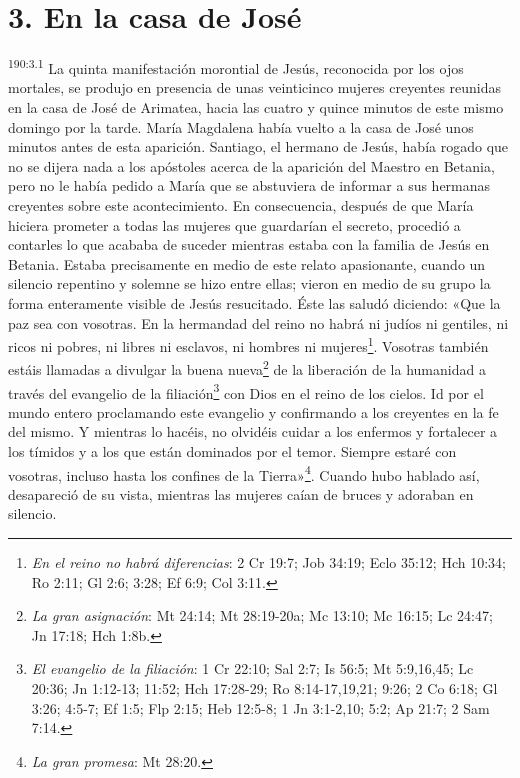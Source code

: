 \section*{3. En la casa de José}
\par
\textsuperscript{190:3.1} La quinta manifestación morontial de Jesús, reconocida por los ojos mortales, se produjo en presencia de unas veinticinco mujeres creyentes reunidas en la casa de José de Arimatea, hacia las cuatro y quince minutos de este mismo domingo por la tarde. María Magdalena había vuelto a la casa de José unos minutos antes de esta aparición. Santiago, el hermano de Jesús, había rogado que no se dijera nada a los apóstoles acerca de la aparición del Maestro en Betania, pero no le había pedido a María que se abstuviera de informar a sus hermanas creyentes sobre este acontecimiento. En consecuencia, después de que María hiciera prometer a todas las mujeres que guardarían el secreto, procedió a contarles lo que acababa de suceder mientras estaba con la familia de Jesús en Betania. Estaba precisamente en medio de este relato apasionante, cuando un silencio repentino y solemne se hizo entre ellas; vieron en medio de su grupo la forma enteramente visible de Jesús resucitado. Éste las saludó diciendo: «Que la paz sea con vosotras. En la hermandad del reino no habrá ni judíos ni gentiles, ni ricos ni pobres, ni libres ni esclavos, ni hombres ni mujeres\footnote{\textit{En el reino no habrá diferencias}: 2 Cr 19:7; Job 34:19; Eclo 35:12; Hch 10:34; Ro 2:11; Gl 2:6; 3:28; Ef 6:9; Col 3:11.}. Vosotras también estáis llamadas a divulgar la buena nueva\footnote{\textit{La gran asignación}: Mt 24:14; Mt 28:19-20a; Mc 13:10; Mc 16:15; Lc 24:47; Jn 17:18; Hch 1:8b.} de la liberación de la humanidad a través del evangelio de la filiación\footnote{\textit{El evangelio de la filiación}: 1 Cr 22:10; Sal 2:7; Is 56:5; Mt 5:9,16,45; Lc 20:36; Jn 1:12-13; 11:52; Hch 17:28-29; Ro 8:14-17,19,21; 9:26; 2 Co 6:18; Gl 3:26; 4:5-7; Ef 1:5; Flp 2:15; Heb 12:5-8; 1 Jn 3:1-2,10; 5:2; Ap 21:7; 2 Sam 7:14.} con Dios en el reino de los cielos. Id por el mundo entero proclamando este evangelio y confirmando a los creyentes en la fe del mismo. Y mientras lo hacéis, no olvidéis cuidar a los enfermos y fortalecer a los tímidos y a los que están dominados por el temor. Siempre estaré con vosotras, incluso hasta los confines de la Tierra»\footnote{\textit{La gran promesa}: Mt 28:20.}. Cuando hubo hablado así, desapareció de su vista, mientras las mujeres caían de bruces y adoraban en silencio.


